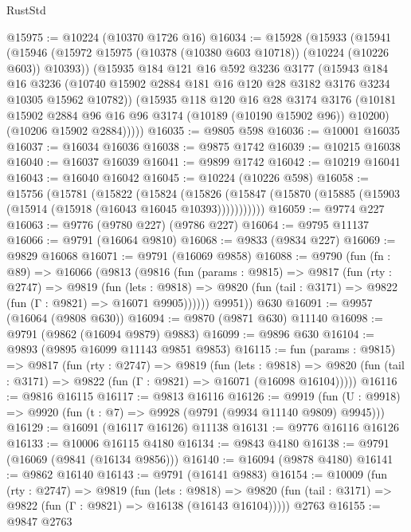 \begin{lexlean}{RustStd}
\begin{coremodule}
@15975 := @10224 (@10370 @1726 @16)
@16034 := @15928
    (@15933
      (@15941
        (@15946 (@15972 @15975 (@10378 (@10380 @603 @10718)) (@10224 (@10226 @603)) @10393))
        (@15935
          @184
          @121
          @16
          @592
          @3236
          @3177
          (@15943
            @184
            @16
            @3236
            (@10740 @15902 @2884 @181 @16 @120 @28 @3182 @3176 @3234 @10305 @15962 @10782))
          (@15935
            @118
            @120
            @16
            @28
            @3174
            @3176
            (@10181 @15902 @2884 @96 @16 @96 @3174 (@10189 (@10190 @15902 @96)) @10200)
            (@10206 @15902 @2884)))))
@16035 := @9805 @598
@16036 := @10001 @16035
@16037 := @16034 @16036
@16038 := @9875 @1742
@16039 := @10215 @16038
@16040 := @16037 @16039
@16041 := @9899 @1742
@16042 := @10219 @16041
@16043 := @16040 @16042
@16045 := @10224 (@10226 @598)
@16058 := @15756
    (@15781
      (@15822
        (@15824
          (@15826 (@15847 (@15870 (@15885 (@15903 (@15914 (@15918 (@16043 @16045 @10393)))))))))))
@16059 := @9774 @227
@16063 := @9776 (@9780 @227) (@9786 @227)
@16064 := @9795 @11137
@16066 := @9791 (@16064 @9810)
@16068 := @9833 (@9834 @227)
@16069 := @9829 @16068
@16071 := @9791 (@16069 @9858)
@16088 := @9790
    (fun (fn : @89) =>
    @16066
      (@9813
        (@9816
          (fun (params : @9815) =>
          @9817
            (fun (rty : @2747) =>
            @9819
              (fun (lets : @9818) =>
              @9820 (fun (tail : @3171) => @9822 (fun (Γ : @9821) => @16071 @9905))))))
        @9951))
    @630
@16091 := @9957 (@16064 (@9808 @630))
@16094 := @9870 (@9871 @630) @11140
@16098 := @9791 (@9862 (@16094 @9879) @9883)
@16099 := @9896 @630
@16104 := @9893 (@9895 @16099 @11143 @9851 @9853)
@16115 := fun (params : @9815) =>
  @9817
    (fun (rty : @2747) =>
    @9819
      (fun (lets : @9818) =>
      @9820 (fun (tail : @3171) => @9822 (fun (Γ : @9821) => @16071 (@16098 @16104)))))
@16116 := @9816 @16115
@16117 := @9813 @16116
@16126 := @9919
    (fun (U : @9918) => @9920 (fun (t : @7) => @9928 (@9791 (@9934 @11140 @9809) @9945)))
@16129 := @16091 (@16117 @16126) @11138
@16131 := @9776 @16116 @16126
@16133 := @10006 @16115 @4180
@16134 := @9843 @4180
@16138 := @9791 (@16069 (@9841 (@16134 @9856)))
@16140 := @16094 (@9878 @4180)
@16141 := @9862 @16140
@16143 := @9791 (@16141 @9883)
@16154 := @10009
    (fun (rty : @2747) =>
    @9819
      (fun (lets : @9818) =>
      @9820 (fun (tail : @3171) => @9822 (fun (Γ : @9821) => @16138 (@16143 @16104)))))
    @2763
@16155 := @9847 @2763

\end{coremodule}
\end{lexlean}
